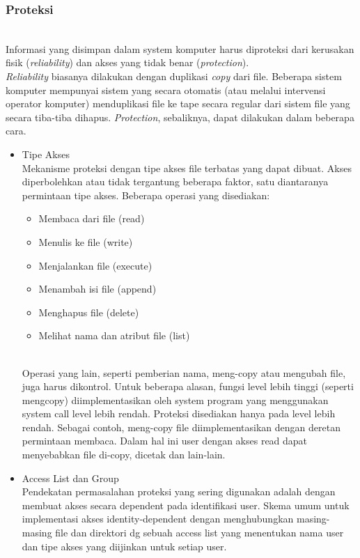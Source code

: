 \documentclass[12pt]{article}
\begin{document}
\begin{itemiz;[e}
\subsubsection{Proteksi}
\\Informasi yang disimpan dalam system komputer harus diproteksi dari kerusakan fisik (\textit{reliability}) dan akses yang tidak benar (\textit{protection}).
\\\textit{Reliability} biasanya dilakukan dengan duplikasi \textit{copy} dari file. Beberapa sistem komputer mempunyai sistem yang secara otomatis (atau melalui intervensi operator komputer) menduplikasi file ke tape secara regular dari sistem file yang secara tiba-tiba dihapus. \textit{Protection}, sebaliknya, dapat dilakukan dalam beberapa cara. 
\begin{itemize}
\item Tipe Akses 
\\Mekanisme proteksi dengan tipe akses file terbatas yang dapat dibuat. Akses diperbolehkan atau tidak tergantung beberapa faktor, satu diantaranya permintaan tipe akses. Beberapa operasi yang disediakan: 
\begin{itemize}
\item Membaca dari file (read) 
\item Menulis ke file (write)  
\item Menjalankan file (execute)  
\item Menambah isi file (append)  
\item Menghapus file (delete)  
\item Melihat nama dan atribut file (list) 
\end{itemize}
\\Operasi yang lain, seperti pemberian nama, meng-copy atau mengubah file, juga harus dikontrol. Untuk beberapa alasan, fungsi level lebih tinggi (seperti mengcopy) diimplementasikan oleh system program yang menggunakan system call level lebih rendah. Proteksi disediakan hanya pada level lebih rendah. Sebagai contoh, meng-copy file diimplementasikan dengan deretan permintaan membaca. Dalam hal ini user dengan akses read dapat menyebabkan file di-copy, dicetak dan lain-lain. 
\item Access List dan Group 
\\Pendekatan permasalahan proteksi yang sering digunakan adalah dengan membuat akses secara dependent pada identifikasi user. Skema umum untuk implementasi akses identity-dependent dengan menghubungkan masing-masing file dan direktori dg sebuah access list yang menentukan nama user dan tipe akses yang diijinkan untuk setiap user. 

\end{itemize}
\end{itemiz;[e}
\end{document}
